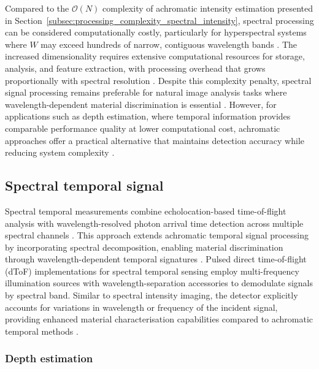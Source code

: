 \documentclass[12pt,a4paper,oneside]{report}
\begin{document}
Compared to the $\mathcal{O}(N)$ complexity of achromatic intensity estimation presented in Section~\ref{subsec:processing_complexity_spectral_intensity}, spectral processing can be considered computationally costly, particularly for hyperspectral systems where $W$ may exceed hundreds of narrow, contiguous wavelength bands \cite{heinz2001,vasile2023}. The increased dimensionality requires extensive computational resources for storage, analysis, and feature extraction, with processing overhead that grows proportionally with spectral resolution \cite{schott2007}. Despite this complexity penalty, spectral signal processing remains preferable for natural image analysis tasks where wavelength-dependent material discrimination is essential \cite{elachi2021,schott2007}. However, for applications such as depth estimation, where temporal information provides comparable performance quality at lower computational cost, achromatic approaches offer a practical alternative that maintains detection accuracy while reducing system complexity \cite{su2016,becker2023}.

\subsection{Spectral temporal signal}
\label{subsec:spectral_temporal_signal}

Spectral temporal measurements combine echolocation-based time-of-flight analysis with wavelength-resolved photon arrival time detection across multiple spectral channels \cite{inagaki2020}. This approach extends achromatic temporal signal processing by incorporating spectral decomposition, enabling material discrimination through wavelength-dependent temporal signatures \cite{su2016,becker2023}. Pulsed direct time-of-flight (dToF) implementations for spectral temporal sensing employ multi-frequency illumination sources with wavelength-separation accessories to demodulate signals by spectral band. Similar to spectral intensity imaging, the detector explicitly accounts for variations in wavelength or frequency of the incident signal, providing enhanced material characterisation capabilities compared to achromatic temporal methods \cite{inagaki2020,su2016}.


\subsubsection{Depth estimation}
\label{subsubsec:spectral_temporal_depth_estimation}
\end{document}
